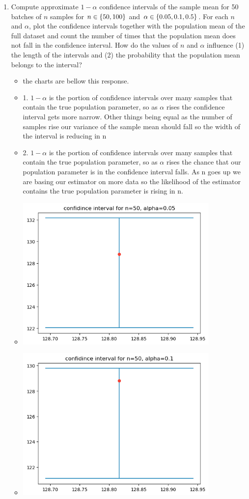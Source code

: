 \documentclass[12pt,twoside]{article}
\begin{document}
\begin{enumerate}
\begin{enumerate}
    
    \item Compute approximate $1-\alpha$ confidence intervals of the sample mean for 50 batches of $n$ samples for $n \in \left\{ 50, 100 \right\}$ and $\alpha \in \left\{ 0.05, 0.1, 0.5 \right\}$. For each $n$ and $\alpha$, plot the confidence intervals together with the population mean of the full dataset and count the number of times that the population mean does not fall in the confidence interval. How do the values of $n$ and $\alpha$ influence (1) the length of the intervals and (2) the probability that the population mean belongs to the interval?
    \begin{itemize}
        \color{blue}
        \item the charts are bellow this response. 
        \item 1. $1-\alpha$ is the portion of confidence intervals over many samples that contain the true population parameter, so as $\alpha$ rises the confidence interval gets more narrow. Other things being equal as the number of samples rise our variance of the sample mean should fall so the width of the interval is reducing in n
        \item 2. $1-\alpha$ is the portion of confidence intervals over many samples that contain the true population parameter, so as $\alpha$ rises the chance that our population parameter is in the confidence interval falls. As n goes up we are basing our estimator on more data so the likelihood of the estimator contains the true population parameter is rising in n. 
        \item \includegraphics[width=10cm]{homework/homework_3/immages/hw_4_2.png}
        \item \includegraphics[width=10cm]{homework/homework_3/immages/hw_4_3.png}

\end{itemize}
\end{enumerate}
\end{enumerate}
\end{document}

